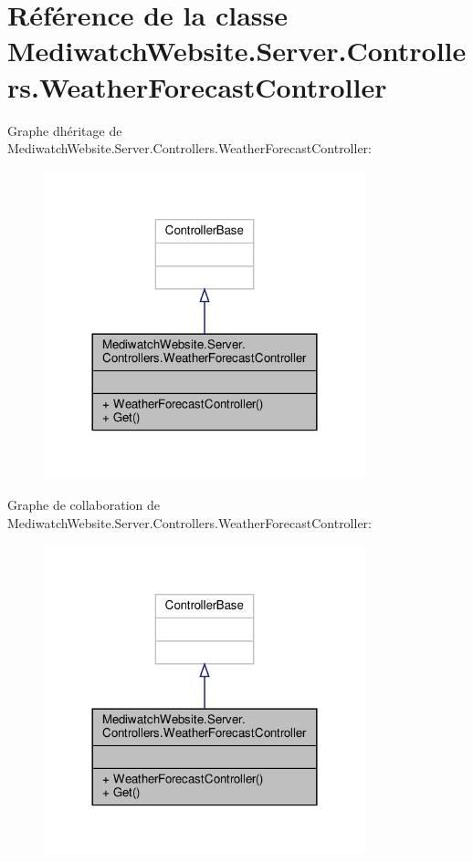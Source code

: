 \hypertarget{class_mediwatch_website_1_1_server_1_1_controllers_1_1_weather_forecast_controller}{}\section{Référence de la classe Mediwatch\+Website.\+Server.\+Controllers.\+Weather\+Forecast\+Controller}
\label{class_mediwatch_website_1_1_server_1_1_controllers_1_1_weather_forecast_controller}


Graphe d\textquotesingle{}héritage de Mediwatch\+Website.\+Server.\+Controllers.\+Weather\+Forecast\+Controller\+:\nopagebreak
\begin{figure}[H]
\begin{center}
\leavevmode
\includegraphics[width=264pt]{class_mediwatch_website_1_1_server_1_1_controllers_1_1_weather_forecast_controller__inherit__graph}
\end{center}
\end{figure}


Graphe de collaboration de Mediwatch\+Website.\+Server.\+Controllers.\+Weather\+Forecast\+Controller\+:\nopagebreak
\begin{figure}[H]
\begin{center}
\leavevmode
\includegraphics[width=264pt]{class_mediwatch_website_1_1_server_1_1_controllers_1_1_weather_forecast_controller__coll__graph}
\end{center}
\end{figure}
